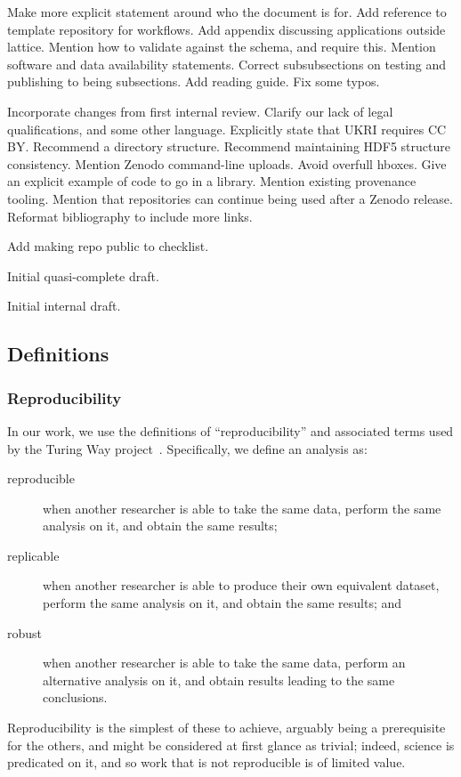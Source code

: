 \documentclass{article}
\begin{document}
\begin{description}
        Make more explicit statement around who the document is for.
        Add reference to template repository for workflows.
        Add appendix discussing applications outside lattice.
        Mention how to validate against the schema,
        and require this.
        Mention software and data availability statements.
        Correct subsubsections on testing and publishing to being subsections.
        Add reading guide.
        Fix some typos.
  \item[v0.0.4 2025-01-28]
        Incorporate changes from first internal review.
        Clarify our lack of legal qualifications,
        and some other language.
        Explicitly state that UKRI requires CC BY\@.
        Recommend a directory structure.
        Recommend maintaining HDF5 structure consistency.
        Mention Zenodo command-line uploads.
        Avoid overfull hboxes.
        Give an explicit example of code to go in a library.
        Mention existing provenance tooling.
        Mention that repositories can continue being used after a Zenodo release.
        Reformat bibliography to include more links.
  \item[v0.0.3 2024-11-29]
        Add making repo public to checklist.
  \item[v0.0.2 2024-11-01]
        Initial quasi-complete draft.
  \item[v0.0.1 2024-10-31]
        Initial internal draft.
\end{description}

\subsection{Definitions}\label{sec:definitions}

\subsubsection{Reproducibility}\label{sec:reproducibility}

In our work,
we use the definitions of ``reproducibility'' and associated terms
used by the Turing Way project~\cite{the_turing_way_community_2023_7625728}.
Specifically,
we define an analysis as:
\begin{description}
  \item[reproducible]
        when another researcher is able to take the same data,
        perform the same analysis on it,
        and obtain the same results;
  \item[replicable]
        when another researcher is able to produce their own equivalent dataset,
        perform the same analysis on it,
        and obtain the same results;
        and
  \item[robust]
        when another researcher is able to take the same data,
        perform an alternative analysis on it,
        and obtain results leading to the same conclusions.
\end{description}
Reproducibility is the simplest of these to achieve,
arguably being a prerequisite for the others,
and might be considered at first glance as trivial;
indeed,
science is predicated on it,
and so work that is not reproducible is of limited value.
\end{document}
